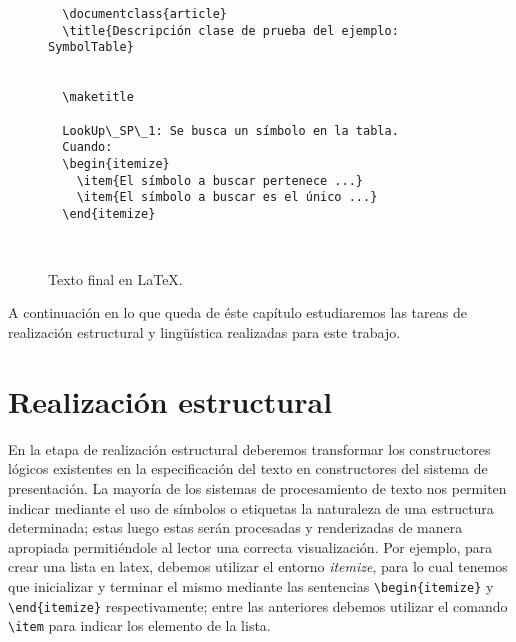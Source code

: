 \begin{figure}[H]
  \begin{verbatim}
  \documentclass{article}
  \title{Descripción clase de prueba del ejemplo: SymbolTable}
  
  
  \maketitle

  LookUp\_SP\_1: Se busca un símbolo en la tabla.  
  Cuando:
  \begin{itemize}
    \item{El símbolo a buscar pertenece ...}
    \item{El símbolo a buscar es el único ...}   
  \end{itemize}
  
  
  \end{verbatim}
  \caption{Texto final en \LaTeX.}
  \label{fig:ej_latex}
\end{figure}

A continuación en lo que queda de éste capítulo estudiaremos las tareas de realización estructural y lingüística realizadas para este trabajo.

\section{Realización estructural}
\label{cap:structure_realization}


En la etapa de realización estructural deberemos transformar los constructores lógicos existentes en la especificación del texto en constructores del sistema de presentación. La mayoría de los sistemas de procesamiento de texto nos permiten indicar mediante el uso de símbolos o etiquetas la naturaleza de una estructura determinada; estas luego estas serán procesadas y renderizadas de manera apropiada permitiéndole al lector una correcta visualización. Por ejemplo, para crear una lista en latex, debemos utilizar el entorno \emph{itemize}, para lo cual tenemos que inicializar y terminar el mismo mediante las sentencias \verb|\begin{itemize}| y \verb|\end{itemize}| respectivamente; entre las anteriores debemos utilizar el comando \verb|\item| para indicar los elemento de la lista.

